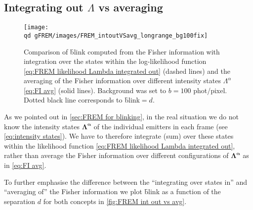 \subsection{Integrating out $\Lambda$ vs averaging\label{sub:Int out vs avg}}
\begin{figure}[!hbt]
	\centering
	\newcommand{\wf}{.49\textwidth}
		\texttt{[image: \\qd gFREM/images/FREM\_intoutVSavg\_longrange\_bg100fix]}
		
	\caption{Comparison of \f{blink} computed from the Fisher information with integration over the states within the log-likelihood function \autoref{eq:FREM likelihood Lambda integrated out} (dashed lines) and the averaging of the Fisher information over different intensity states $\Lambda^{\alpha}$ \autoref{eq:FI avg} (solid lines). Background was set to $b=100$ phot/pixel. Dotted black line corresponds to \f{blink}$=d$.}
	\label{fig:FREM int out vs avg}
\end{figure}
% 
As we pointed out in \autoref{sec:FREM for blinking}, in the real situation we do not know the intensity states $\bm{\Lambda^{\alpha}}$ of the individual emitters in each frame (see \autoref{eq:intensity states}). We have to therefore integrate (sum) over these states within the likelihood function \autoref{eq:FREM likelihood Lambda integrated out}, rather than average the Fisher information over different configurations of $\bm{\Lambda^{\alpha}}$ as in \autoref{eq:FI avg}. 

To further emphasise the difference between the ``integrating over states in'' and ``averaging of'' the Fisher information we plot \f{blink} as a function of the separation $d$ for both concepts in \autoref{fig:FREM int out vs avg}.

